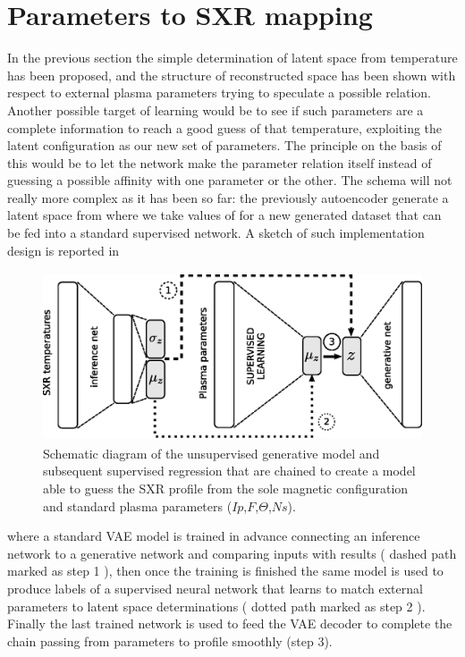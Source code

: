 \section{Parameters to SXR mapping}

In the previous section the simple determination of latent space from temperature has been proposed, and the structure of reconstructed space has been shown with respect to external plasma parameters trying to speculate a possible relation.
Another possible target of learning would be to see if such parameters are a complete information to reach a good guess of that temperature, exploiting the latent configuration as our new set of parameters.
The principle on the basis of this would be to let the network make the parameter relation itself instead of guessing a possible affinity with one parameter or the other.
The schema will not really more complex as it has been so far: the previously autoencoder generate a latent space from where we take values of for a new generated dataset that can be fed into a standard supervised network. 
A sketch of such implementation design is reported in~\Figure{\ref{fig:SXR_from_param}}
\begin{figure}
    \centering
    \includegraphics[height=5cm]{img/STEP12_7/SXR_from_PARAMS.eps}
    \caption{Schematic diagram of the unsupervised generative model and subsequent supervised regression that are chained to create a model able to guess the SXR profile from the sole magnetic configuration and standard plasma parameters ($Ip$,$F$,$\Theta$,$Ns$). }
    \label{fig:SXR_from_param}
\end{figure}
where a standard \acs{VAE} model is trained in advance connecting an inference network to a generative network and comparing inputs with results ( dashed path marked as step 1 ), then once the training is finished the same model is used to produce labels of a supervised neural network that learns to match external parameters to latent space determinations ( dotted path marked as step 2 ). Finally the last trained network is used to feed the \acs{VAE} decoder to complete the chain passing from parameters to profile smoothly (step 3).

